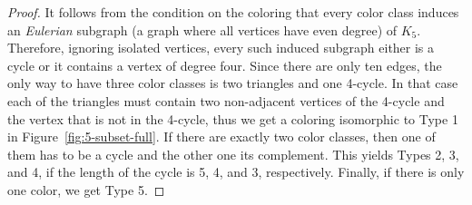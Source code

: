 \documentclass{article}
\begin{document}
\begin{proof}

It follows from the condition on the coloring that every color class induces 
an {\em Eulerian} subgraph (a graph where all vertices have even 
degree) of $K_5$. Therefore, ignoring isolated vertices, every such induced subgraph 
either is a cycle or it contains a vertex of degree four. Since there are only 
ten edges, the only way to have three color classes is two triangles and one 
4-cycle. In that case each of the triangles must contain two non-adjacent 
vertices of the 4-cycle and the vertex that is not in the 4-cycle, thus we get a 
coloring isomorphic to Type 1 in Figure~\ref{fig:5-subset-full}. If there are 
exactly two color classes, then one of them has to be a cycle and the other one 
its complement. This yields Types 2, 3, and 4, if the length of the cycle is 5, 
4, and 3, respectively. Finally, if there is only one color, we get Type 5. 


%
%


\end{proof}
\end{document}
